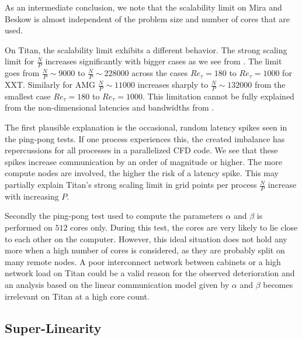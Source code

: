 \documentclass{sig-alternate}
\begin{document}
As an intermediate conclusion, we note that the scalability limit on Mira and Beskow is almost independent of the problem size and number of cores that are used. 

On Titan, the scalability limit exhibits a different behavior.
The strong scaling limit for $\frac{N}{P}$ increases
significantly with bigger cases as we see from .
The limit goes from $\frac{N}{P} \sim 9000$ to $\frac{N}{P} \sim 228000$ across the cases $Re_{\tau}=180$ to $Re_{\tau}=1000$ for XXT. Similarly for AMG $\frac{N}{P}  \sim 11000$ increases sharply to $\frac{N}{P} \sim 132000$ from the smallest case $Re_{\tau}=180$ to 
$Re_{\tau}=1000$. This limitation cannot be fully explained from the non-dimensional latencies and bandwidths from . %

The first plausible explanation is the occasional, random latency spikes seen in the ping-pong tests. If
one process experiences this, the created imbalance has repercussions for all
processes in a parallelized CFD code. We see that these spikes increase communication by
an order of magnitude or higher. The more compute nodes are involved, the higher
the risk of a latency spike. This may partially explain Titan's strong
scaling limit in grid points per process $\frac{N}{P}$ increase with increasing $P$.

Secondly the ping-pong test used to compute the parameters $\alpha$ and $\beta$ is performed on $512$ cores only. During this test, the cores are very likely to lie close to each other on the computer. 
However, this ideal situation does not hold any more when a high number of cores
is considered, as they are probably split on many remote nodes.
A poor interconnect network between cabinets or a high network load on Titan 
could be a valid reason for the observed deterioration and an analysis based on the linear communication model given by  
$\alpha$ and $\beta$  becomes irrelevant on Titan at a high core count.



\subsection{Super-Linearity}
\end{document}
